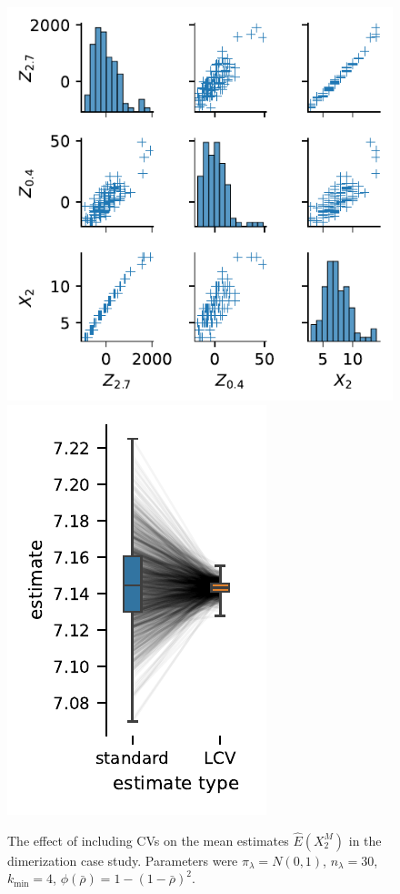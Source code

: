 \begin{figure}[htb]
  \centering
  \includegraphics[scale=.65]{gfx/correlation.pdf}
  \hspace*{2em}
  \includegraphics[scale=.65]{gfx/adjustment.pdf}
  \caption[\ac{CV} mean estimates v.\ std.\ mean estimates]{The
    effect of including \acp{CV} on the mean estimates $\hat{E}(X^M_2)$
    in the dimerization case study. Parameters were
    ${\pi}_{\lambda}=N(0,1)$, ${n}_{\lambda}=30$, ${k}_{\min}=4$,
  $\phi(\bar\rho)=1-{(1 - \bar\rho)}^2$.}
\end{figure}

